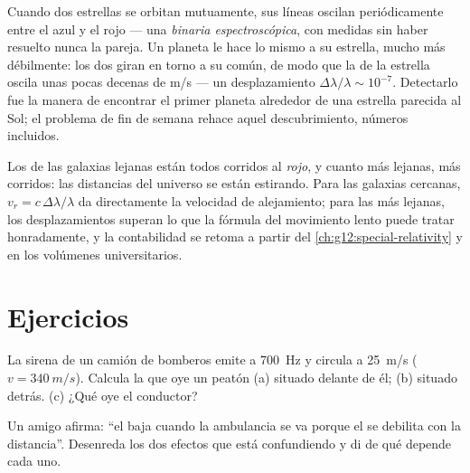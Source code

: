 \begin{example}\label{ex:g12:doppler-effect:wobble}
Cuando dos estrellas se orbitan mutuamente, sus líneas oscilan
periódicamente entre el azul y el rojo --- una \emph{binaria
espectroscópica}, con  medidas sin
haber resuelto nunca la pareja. Un planeta le hace lo mismo a su
estrella, mucho más débilmente: los dos giran en torno a su  común, de modo que la  de la estrella oscila unas
pocas decenas de \unit{m/s} --- un desplazamiento
$\Delta\lambda/\lambda \sim 10^{-7}$. Detectarlo fue la manera de
encontrar el primer planeta alrededor de una estrella parecida al Sol;
el problema de fin de semana rehace aquel descubrimiento, números
incluidos.
\end{example}

\begin{remark}\label{rem:g12:doppler-effect:expansion}
Los  de las galaxias lejanas están todos corridos al
\emph{rojo}, y cuanto más lejanas, más corridos: las distancias del
universo se están estirando. Para las galaxias cercanas,
$v_r = c\,\Delta\lambda/\lambda$ da directamente la velocidad de
alejamiento; para las más lejanas, los desplazamientos superan lo que la
fórmula del movimiento lento puede tratar honradamente, y la
contabilidad se retoma a partir del
\cref{ch:g12:special-relativity} y en los volúmenes universitarios.
\end{remark}

\section{Ejercicios}

\begin{exercise}[$\star$]\label{exo:g12:doppler-effect:1}
La sirena de un camión de bomberos emite a \qty{700}{Hz} y circula a
\qty{25}{m/s} ($v = \qty{340}{m/s}$). Calcula la  que oye un
peatón (a) situado delante de él; (b) situado detrás. (c) ¿Qué oye el
conductor?
\end{exercise}

\begin{exercise}[$\star$]\label{exo:g12:doppler-effect:2}
Un amigo afirma: ``el  baja cuando la ambulancia se va porque el
 se debilita con la distancia''. Desenreda los dos efectos que
está confundiendo y di de qué depende cada uno.
\end{exercise}


